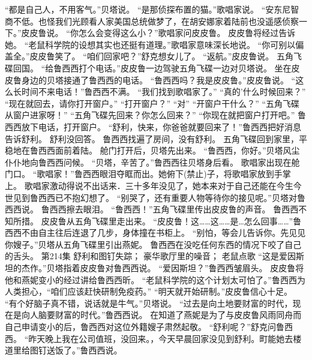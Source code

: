 \documentclass[a4paper,12pt,UTF8,twoside]{ctexbook}
\begin{document}
        “都是自己人，不用客气。”贝塔说。 
        “是那侦探布置的猫。”歌唱家说。 
        “安东尼智商不低。也怪我们光顾看人家美国总统做梦了，在胡安娜家着陆前也没遥感侦察一下。”皮皮鲁说。 
        “你怎么会变得这么小？”歌唱家问皮皮鲁。 
        皮皮鲁将经过告诉她。 
        “老鼠科学院的设想其实也还挺有道理。”歌唱家意味深长地说。 
        “你可别以偏盖全。”皮皮鲁笑了。 
        “咱们回家吧？”舒克想女儿了。 
        “返航。”皮皮鲁说。 
        五角飞碟回国。 
        “给鲁西西打个电话。”皮皮鲁一边驾驶五角飞碟一边对贝塔说。 
        坐在皮皮鲁身边的贝塔接通了鲁西西的电话。 
        “鲁西西吗？我是皮皮鲁。”皮皮鲁说。 
        “这么长时间不来电话！”鲁西西不满。 
        “我们找到歌唱家了。” 
        “真的'什么时候回来？” 
        “现在就回去，请你打开窗户。” 
        “打开窗户？” 
        “对” 
        “开窗户干什么？” 
        “五角飞碟从窗户进家呀！” 
        “五角飞碟先回来？你怎么回来？” 
        “你现在就把窗户打开吧。” 
        鲁西西放下电话，打开窗户。 
        “舒利，快来，你爸爸就要回来了！”鲁西西把好消息告诉舒利。 
        舒利没回答。 
        鲁西西找遍了房间，没有舒利。 
        五角飞碟回到家里，平稳地在鲁西西面前着陆。 
        舱门打开后，贝塔先出来。 
        “鲁西西，你好。”贝塔风尘仆仆地向鲁西西问候。 
        “贝塔，辛苦了。”鲁西西往贝塔身后看。 
        歌唱家出现在舱门口。 
        “歌唱家！”鲁西西眼泪夺眶而出。她俯下(禁止)子，将歌唱家放到手掌上。 
        歌唱家激动得说不出话来．三十多年没见了，她本来对于自己还能在今生今世见到鲁西西已不抱幻想了。 
        “别哭了，还有重要人物等待你的接见呢。”贝塔对鲁西西说。 
        鲁西西擦去眼泪。 
        “鲁西西！”五角飞碟里传出皮皮鲁的声音。 
        鲁西西不知所措。 
        皮皮鲁从五角飞碟里走出来。 
        “皮皮鲁！这……这……是…怎么回事……”鲁西西不由自主往后连退了几步，身体撞在书柜上。 
        “别怕，等会儿告诉你。先见见你嫂子。”贝塔从五角飞碟里引出燕妮。 
        鲁西西在没吃任何东西的情况下咬了自己的舌头。   第214集 
        舒利和图钉失踪； 
        豪华歌厅里的噪音； 
        老鼠点歌   
        “这是爱因斯坦的杰作。”贝塔指着皮皮鲁对鲁西西说。 
        “爱因斯坦？”鲁西西皱眉头。 
        皮皮鲁将他和燕妮变小的经过讲给鲁西西昕。 
        “老鼠科学院的这个计划太可怕了。”鲁西西为人类担心，“咱们应该赶快研制免疫药。” 
        “明天就开始研制。”皮皮鲁信心十足。 
        “有个好脑子真不错，说话就是牛气。”贝塔说。 
        “过去是向土地要财富的时代，现在是向人脑要财富的时代。”鲁西西说。 
        在知道了燕妮是为了与皮皮鲁风雨同舟而自己申请变小的后，鲁西西对这位外籍嫂子肃然起敬。 
        “舒利呢？”舒克问鲁西西。 
        “昨天晚上我在公司值班，没回来。，今天早晨回家没见到舒利。町能她去楼道里给图钉送饭了。”鲁西西说。 
\end{document}
